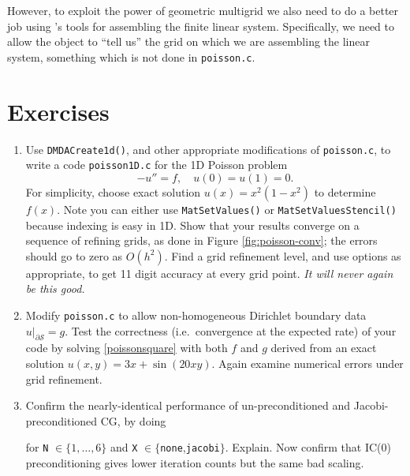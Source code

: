 However, to exploit the power of geometric multigrid we also need to do a better job using \PETSc's tools for assembling the finite linear system.  Specifically, we need to allow the \pDMDA object to ``tell us'' the grid on which we are assembling the linear system, something which is not done in \texttt{poisson.c}.


\section{Exercises}

\renewcommand{\labelenumi}{\arabic{chapter}.\arabic{enumi}\quad}

\begin{enumerate}

\item Use \texttt{DMDACreate1d()}, and other appropriate modifications of \texttt{poisson.c}, to write a code \texttt{poisson1D.c} for the 1D Poisson problem
    $$-u'' = f, \quad u(0)=u(1)=0.$$
For simplicity, choose exact solution $u(x)=x^2(1-x^2)$ to determine $f(x)$.  Note you can either use \texttt{MatSetValues()} or \texttt{MatSetValuesStencil()} because indexing is easy in 1D.  Show that your results converge on a sequence of refining grids, as done in Figure \ref{fig:poisson-conv}; the errors should go to zero as $O(h^2)$.  Find a grid refinement level, and use \pKSP options as appropriate, to get 11 digit accuracy at every grid point.  \emph{It will never again be this good.}

\item Modify \texttt{poisson.c} to allow non-homogeneous Dirichlet boundary data $u|_{\partial \mathcal{S}}=g$.  Test the correctness (i.e.~convergence at the expected rate) of your code by solving \eqref{poissonsquare} with both $f$ and $g$ derived from an exact solution $u(x,y)=3x + \sin(20xy)$.  Again examine  numerical errors under grid refinement.

\item \label{exer:st:jacobivsnone} Confirm the nearly-identical performance of un-preconditioned and Jacobi-preconditioned CG, by doing
for \texttt{N} $\in\{1,\dots,6\}$ and \texttt{X} $\in\{$\texttt{none},\texttt{jacobi}$\}$.  Explain.
Now confirm that IC($0$) preconditioning gives lower iteration counts but the same bad scaling.


\end{enumerate}
